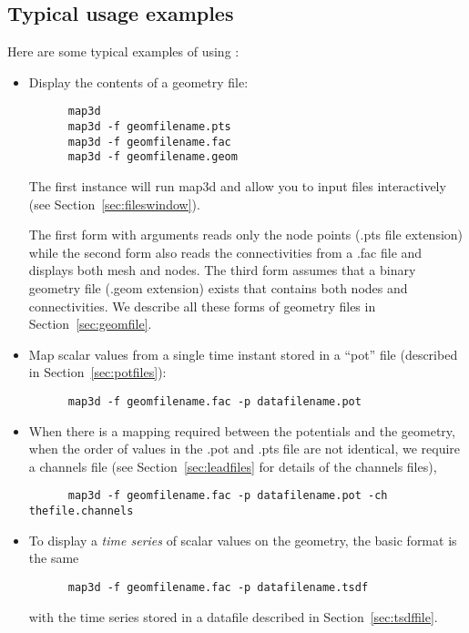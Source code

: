 \subsection{Typical usage examples}
\label{sec:usage-examples} 

\noindent
Here are some typical examples of using \map{}:
%
\begin{itemize}
  \item Display the contents of a geometry file:
  \begin{verbatim}
      map3d
      map3d -f geomfilename.pts
      map3d -f geomfilename.fac
      map3d -f geomfilename.geom

  \end{verbatim}
  \vspace{-.2in}
  The first instance will run map3d and allow you to input files interactively
  (see Section~\ref{sec:fileswindow}).
  
  The first form with arguments reads only the node points (.pts file
  extension) while the second form also reads the connectivities from a
  .fac file and displays both mesh and nodes.  The third form assumes that
  a binary geometry file (.geom extension) exists that contains both nodes
  and connectivities.  We describe all these forms of geometry files in
  Section~\ref{sec:geomfile}.
  
  \item Map scalar values from a single time instant stored in a ``pot''
  file (described in Section~\ref{sec:potfiles}):
  \begin{verbatim}
      map3d -f geomfilename.fac -p datafilename.pot
  \end{verbatim}

  \item When there is a mapping required between the potentials and the 
  geometry, \eg{} when the order of values in the .pot and .pts file 
  are not identical, we require a channels file (see 
  Section~\ref{sec:leadfiles} for details of the channels files),
  \begin{verbatim}
      map3d -f geomfilename.fac -p datafilename.pot -ch thefile.channels
  \end{verbatim}
   
  \item To display a \emph{time series} of scalar values on the geometry, 
  the basic format is the same
  \begin{verbatim}
      map3d -f geomfilename.fac -p datafilename.tsdf
  \end{verbatim}
  \vspace{-.2in}
  with the time series stored in a datafile described in
  Section~\ref{sec:tsdffile}.


\end{itemize}
